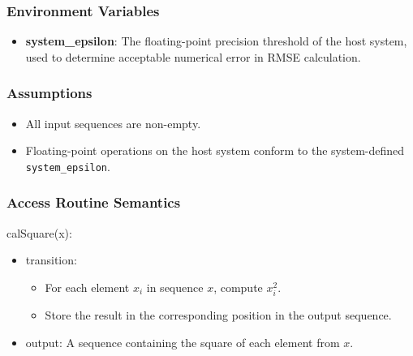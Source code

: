 \documentclass[12pt, titlepage]{article}
\begin{document}
\subsubsection{Environment Variables}

\begin{itemize}
\item \textbf{system\_epsilon}: The floating-point precision threshold of the
host system, used to determine acceptable numerical error in RMSE calculation.
\end{itemize}

\subsubsection{Assumptions}

\begin{itemize}
\item All input sequences are non-empty.
\item Floating-point operations on the host system conform to the system-defined
\texttt{system\_epsilon}.
\end{itemize}

\subsubsection{Access Routine Semantics}

\noindent calSquare(x):
\begin{itemize}
\item transition:
    \begin{itemize}
    \item For each element $x_i$ in sequence $x$, compute $x_i^2$.
    \item Store the result in the corresponding position in the output sequence.
    \end{itemize}
\item output: A sequence containing the square of each element from $x$.
\end{itemize}
\end{document}
